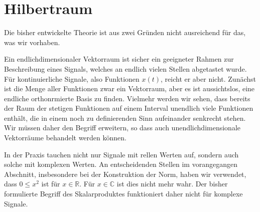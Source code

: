 %
%
%
\section{Hilbertraum
\label{section:hilbertraum}}
Die bisher entwickelte Theorie ist aus zwei Gründen nicht ausreichend für das,
was wir vorhaben.

Ein endlichdimensionaler Vektorraum ist sicher ein geeigneter Rahmen zur
Beschreibung eines Signals, welches an endlich vielen Stellen abgetastet
wurde.
Für kontinuierliche Signale, also Funktionen $x(t)$,  reicht er aber nicht.
Zunächst ist die Menge aller Funktionen zwar ein Vektorraum, aber es ist
aussichtslos, eine endliche orthonrmierte Basis zu finden.
Vielmehr werden wir sehen, dass bereits der Raum der stetigen Funktionen
auf einem Interval unendlich viele Funktionen enthält, die in einem noch
zu definierenden Sinn aufeinander senkrecht stehen.
Wir müssen daher den Begriff erweitern, so dass auch unendlichdimensionale
Vektorräume behandelt werden können.

In der Praxis tauchen nicht nur Signale mit rellen Werten auf, sondern
auch solche mit komplexen Werten.
An entscheidenden Stellen im vorangegangen Abschnitt, insbesondere bei
der Konstruktion der Norm, haben wir verwendet,
dass $0 \le x^2$ ist für $x\in\mathbb R$. Für $x\in\mathbb C$ ist dies
nicht mehr wahr.
Der bisher formulierte Begriff des Skalarproduktes funktioniert daher
nicht für komplexe Signale.

